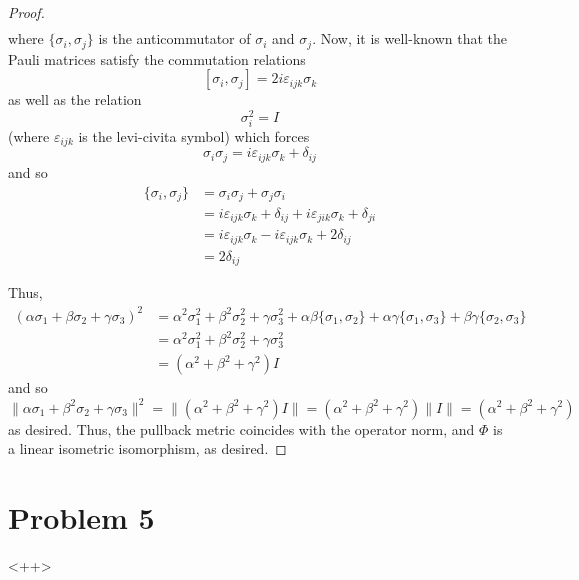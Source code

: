 \documentclass[fontsize=11pt]{scrartcl} %
\numberwithin{equation}{section} %
\numberwithin{figure}{section} %
\numberwithin{table}{section} %
\begin{document}
\begin{proof}
\[\begin{aligned}
\end{aligned}
    \]
    where $\{\sigma_i,\sigma_j\}$ is the anticommutator of $\sigma_i$ and
    $\sigma_j$. Now, it is well-known that the Pauli matrices satisfy the
    commutation relations
    \[
        [\sigma_i,\sigma_j]=2i\varepsilon_{ijk}\sigma_k
    \]
    as well as the relation
    \[
        \sigma_i^2 = I
    \]
    (where $\varepsilon_{ijk}$ is the levi-civita symbol) which forces
    \[
        \sigma_i\sigma_j = i\varepsilon_{ijk}\sigma_k + \delta_{ij}
    \]
    and so
    \[
        \begin{aligned}
        \{\sigma_i,\sigma_j\} &= \sigma_i\sigma_j + \sigma_j\sigma_i\\
        &= i\varepsilon_{ijk}\sigma_k + \delta_{ij} + i\varepsilon_{jik}\sigma_k +
        \delta_{ji}\\
        &= i\varepsilon_{ijk}\sigma_k - i\varepsilon_{ijk}\sigma_k +
        2\delta_{ij}\\
        &= 2\delta_{ij}
    \end{aligned}
    \]

    Thus,
    \[
\begin{aligned}
    (\alpha\sigma_1+\beta\sigma_2+\gamma\sigma_3)^2 &=
    \alpha^2\sigma_1^2 + \beta^2\sigma_2^2  + \gamma\sigma_3^2 +
    \alpha\beta\{\sigma_1,\sigma_2\} + \alpha\gamma\{\sigma_1,\sigma_3\} +
    \beta\gamma\{\sigma_2,\sigma_3\}\\
    &= 
    \alpha^2\sigma_1^2 + \beta^2\sigma_2^2  + \gamma\sigma_3^2\\
    &=(\alpha^2+\beta^2+\gamma^2)I
\end{aligned}
    \]
    and so
    \[
    \|\alpha\sigma_1 + \beta^2\sigma_2 + \gamma\sigma_3\|^2 =
    \|(\alpha^2+\beta^2+\gamma^2)I\| = (\alpha^2+\beta^2+\gamma^2)\|I\|
    =(\alpha^2+\beta^2+\gamma^2)
    \]
    as desired. Thus, the pullback metric coincides with the operator norm, and
    $\Phi$ is a linear isometric isomorphism, as desired.
\end{proof}

\newpage

\section*{Problem 5}<++>
\end{document}
